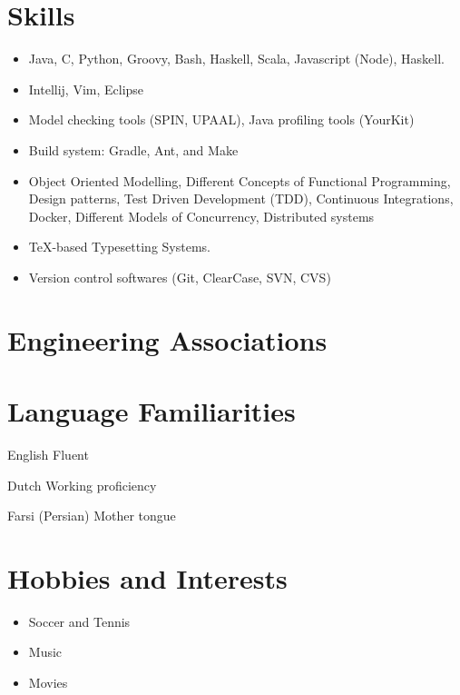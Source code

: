 \documentclass[a4paper]{article}
\begin{document}
\section{Skills}
\begin{itemize}

\item Java, C, Python, Groovy, Bash, Haskell, Scala, Javascript (Node), Haskell.

\item Intellij, Vim, Eclipse 

\item Model checking tools (SPIN, UPAAL), Java profiling tools (YourKit)

\item Build system: Gradle, Ant, and Make 

\item Object Oriented Modelling, Different Concepts of Functional Programming, Design patterns, Test Driven Development (TDD), Continuous Integrations, Docker, Different Models of Concurrency, Distributed systems

\item \TeX-based Typesetting Systems.


\item Version control softwares (Git, ClearCase, SVN, CVS)
\end{itemize}

\section{Engineering Associations}
\begin{itemize}

\end{itemize}

\section{Language Familiarities}
\begin{CV}
\item [English] Fluent
\item [Dutch] Working proficiency 
\item [Farsi (Persian)]  Mother tongue
\end{CV}

\section{Hobbies and Interests}
\begin{itemize}
  \item Soccer and Tennis
  \item Music
  \item Movies
\end{itemize}
\end{document}
